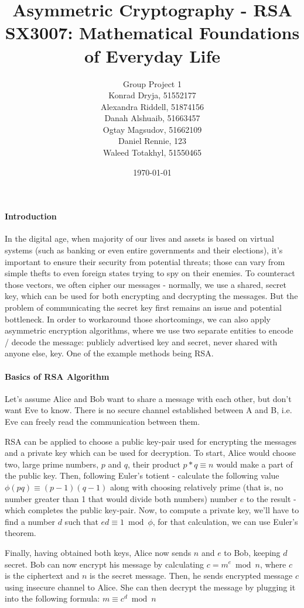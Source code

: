 \documentclass[11pt]{article}
\title{Asymmetric Cryptography - RSA \\
\large SX3007: Mathematical Foundations of Everyday Life}
\date{\today}
\author{Group Project 1 \\
  Konrad Dryja, 51552177 \\
  Alexandra Riddell, 51874156 \\
  Danah Alshuaib, 51663457 \\
  Ogtay Magsudov, 51662109 \\
  Daniel Rennie, 123 \\
  Waleed Totakhyl, 51550465}
\begin{document}
\maketitle
\begin{multicols}{2}

\paragraph{Introduction}
In the digital age, when majority of our lives and assets is based on virtual systems (such as banking or even entire governments and their elections), it's important to ensure their security from potential threats; those can vary from simple thefts to even foreign states trying to spy on their enemies. To counteract those vectors, we often cipher our messages - normally, we use a shared, secret key, which can be used for both encrypting and decrypting the messages. But the problem of communicating the secret key first remains an issue and potential bottleneck. In order to workaround those shortcomings, we can also apply asymmetric encryption algorithms, where we use two separate entities to encode / decode the message: publicly advertised key and secret, never shared with anyone else, key. One of the example methods being RSA.

\paragraph{Basics of RSA Algorithm}
Let's assume Alice and Bob want to share a message with each other, but don't want Eve to know. There is no secure channel established between A and B, i.e. Eve can freely read the communication between them.

RSA can be applied to choose a public key-pair used for encrypting the messages and a private key which can be used for decryption. To start, Alice would choose two, large prime numbers, $p$ and $q$, their product $p*q \equiv n$ would make a part of the public key. Then, following Euler's totient - calculate the following value $\phi(pq) \equiv (p-1)(q-1)$ along with choosing relatively prime (that is, no number greater than 1 that would divide both numbers) number $e$ to the result - which completes the public key-pair. Now, to compute a private key, we'll have to find a number $d$ such that \(ed \equiv 1 \bmod \phi\), for that calculation, we can use Euler's theorem.

Finally, having obtained both keys, Alice now sends $n$ and $e$ to Bob, keeping $d$ secret. Bob can now encrypt his message by calculating \(c = m^e \bmod n\), where $c$ is the ciphertext and $n$ is the secret message. Then, he sends encrypted message $c$ using insecure channel to Alice. She can then decrypt the message by plugging it into the following formula: $m \equiv c^d \bmod n$



\end{multicols}
\end{document}
